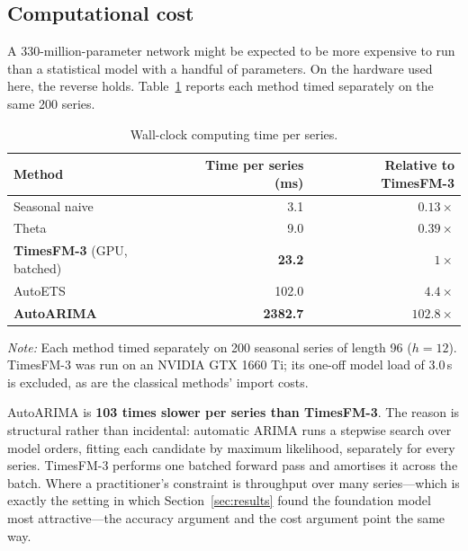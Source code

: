 \documentclass[11pt]{article}
\providecommand{\sectionref}[1]{Section~\ref{#1}}
\providecommand{\tableref}[1]{Table~\ref{#1}}
\begin{document}
\subsection{Computational cost}
\label{sec:cost}

A 330-million-parameter network might be expected to be more expensive to run than a
statistical model with a handful of parameters. On the hardware used here, the reverse holds.
\tableref{tab:timing} reports each method timed separately on the same 200 series.

\begin{table}[!htbp]
\centering
\begin{threeparttable}
\caption{Wall-clock computing time per series.}
\label{tab:timing}
\begin{tabular}{lrr}
\toprule
Method & Time per series (ms) & Relative to TimesFM-3 \\
\midrule
Seasonal naive & 3.1 & $0.13\times$ \\
Theta & 9.0 & $0.39\times$ \\
\textbf{TimesFM-3} (GPU, batched) & \textbf{23.2} & $1\times$ \\
AutoETS & 102.0 & $4.4\times$ \\
\textbf{AutoARIMA} & \textbf{2382.7} & $\mathbf{102.8\times}$ \\
\bottomrule
\end{tabular}
\begin{tablenotes}[flushleft]\footnotesize
\item \textit{Note:} Each method timed separately on 200 seasonal series of length 96
($h = 12$). TimesFM-3 was run on an NVIDIA GTX 1660 Ti; its one-off model load of 3.0\,s is
excluded, as are the classical methods' import costs.
\end{tablenotes}
\end{threeparttable}
\end{table}

AutoARIMA is \textbf{103 times slower per series than TimesFM-3}. The reason is structural
rather than incidental: automatic ARIMA runs a stepwise search over model orders, fitting each
candidate by maximum likelihood, separately for every series. TimesFM-3 performs one batched
forward pass and amortises it across the batch. Where a practitioner's constraint is throughput
over many series---which is exactly the setting in which \sectionref{sec:results} found the
foundation model most attractive---the accuracy argument and the cost argument point the same
way.
\end{document}
